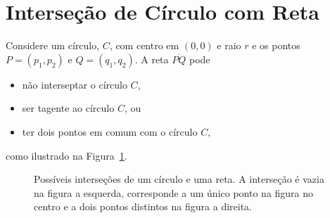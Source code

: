 %
%
%

\section{Interseção de Círculo com Reta} \label{sse:circle_line}
\nocite{Wolfram:CircleLine}
Considere um círculo, $C$, com centro em $(0, 0)$ e raio $r$ e os pontos $P =
(p_1, p_2)$ e $Q = (q_1, q_2)$. A reta $\overline{PQ}$ pode
\begin{itemize}
    \item não interseptar o círculo $C$,
    \item ser tagente ao círculo $C$, ou
    \item ter dois pontos em comum com o círculo $C$,
\end{itemize}
como ilustrado na Figura~\ref{fig:circle_line}.
\begin{figure}[!htb]
    \centering
    \caption{Possíveis interseções de um círculo e uma reta. A interseção é
    vazia na figura a esquerda, corresponde a um único ponto na
    figura no centro e  a dois pontos distintos na
    figura a direita.}
    \label{fig:circle_line}
\end{figure}

